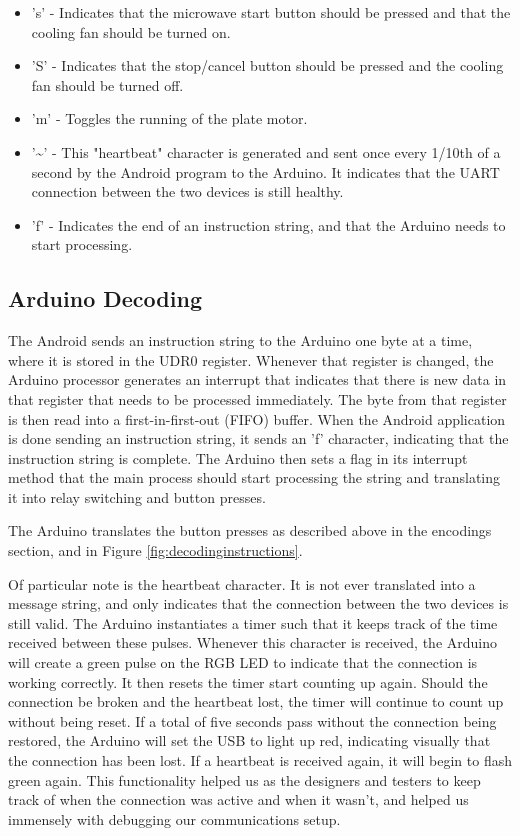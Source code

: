 \documentclass[10pt,journal,letterpaper,twocolumn]{IEEEtran}
\begin{document}
\begin{itemize}
        \item 's' - Indicates that the microwave start button should be pressed and that the cooling fan should be turned on.
        \item 'S' - Indicates that the stop/cancel button should be pressed and the cooling fan should be turned off.
        \item 'm' - Toggles the running of the plate motor.
        \item '\textasciitilde' - This "heartbeat" character is generated and sent once every 1/10th of a second by the Android program to the Arduino.  It indicates that the UART connection between the two devices is still healthy.
        \item 'f' - Indicates the end of an instruction string, and that the Arduino needs to start processing.

\end{itemize}

\subsection*{Arduino Decoding}
The Android sends an instruction string to the Arduino one byte at a time, where it is stored in the UDR0 register.  Whenever that register is changed, the Arduino processor generates an interrupt that indicates that there is new data in that register that needs to be processed immediately.  The byte from that register is then read into a first-in-first-out (FIFO) buffer.  When the Android application is done sending an instruction string, it sends an 'f' character, indicating that the instruction string is complete.  The Arduino then sets a flag in its interrupt method that the main process should start processing the string and translating it into relay switching and button presses.

The Arduino translates the button presses as described above in the encodings section, and in Figure \ref{fig:decodinginstructions}.

Of particular note is the heartbeat character.  It is not ever translated into a message string, and only indicates that the connection between the two devices is still valid.  The Arduino instantiates a timer such that it keeps track of the time received between these pulses.  Whenever this character is received, the Arduino will create a green pulse on the RGB LED to indicate that the connection is working correctly.  It then resets the timer start counting up again.  Should the connection be broken and the heartbeat lost, the timer will continue to count up without being reset.  If a total of five seconds pass without the connection being restored, the Arduino will set the USB to light up red, indicating visually that the connection has been lost.  If a heartbeat is received again, it will begin to flash green again.  This functionality helped us as the designers and testers to keep track of when the connection was active and when it wasn't, and helped us immensely with debugging our communications setup.
\end{document}
